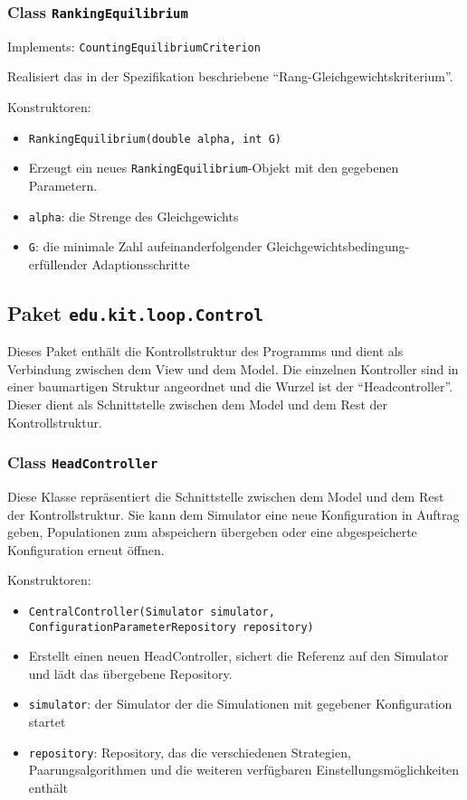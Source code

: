 \documentclass[parskip=full,11pt]{scrartcl}
\begin{document}
\subsubsection{Class \texttt{RankingEquilibrium}}
Implements: \texttt{CountingEquilibriumCriterion}

Realisiert das in der Spezifikation beschriebene \enquote{Rang-Gleichgewichtskriterium}.

Konstruktoren:
\begin{itemize}\itemsep -10pt
\item \texttt{RankingEquilibrium(double alpha, int G)}
\item[] Erzeugt ein neues \texttt{RankingEquilibrium}-Objekt mit den gegebenen Parametern.
\item[] \texttt{alpha}: die Strenge des Gleichgewichts
\item[] \texttt{G}: die minimale Zahl aufeinanderfolgender Gleichgewichtsbedingung-erfüllender Adaptionsschritte
\end{itemize}

\subsection{Paket \texttt{edu.kit.loop.Control}}
Dieses Paket enthält die Kontrollstruktur des Programms und dient als Verbindung zwischen dem View und dem Model.
Die einzelnen Kontroller sind in einer baumartigen Struktur angeordnet und die Wurzel ist der \enquote{Headcontroller}. Dieser dient als Schnittstelle zwischen dem Model und dem Rest der Kontrollstruktur.

\subsubsection{Class \texttt{HeadController}}
Diese Klasse repräsentiert die Schnittstelle zwischen dem Model und dem Rest der Kontrollstruktur. Sie kann dem Simulator eine neue Konfiguration in Auftrag geben, Populationen zum abspeichern übergeben oder eine abgespeicherte Konfiguration erneut öffnen.

Konstruktoren:
\begin{itemize}\itemsep -10pt
\item \texttt{CentralController(Simulator simulator, ConfigurationParameterRepository repository)}
\item[] Erstellt einen neuen HeadController, sichert die Referenz auf den Simulator und lädt das übergebene Repository.
\item[] \texttt{simulator}: der Simulator der die Simulationen mit gegebener Konfiguration startet
\item[] \texttt{repository}: Repository, das die verschiedenen Strategien, Paarungsalgorithmen und die weiteren verfügbaren Einstellungsmöglichkeiten enthält
\end{itemize}
\end{document}
